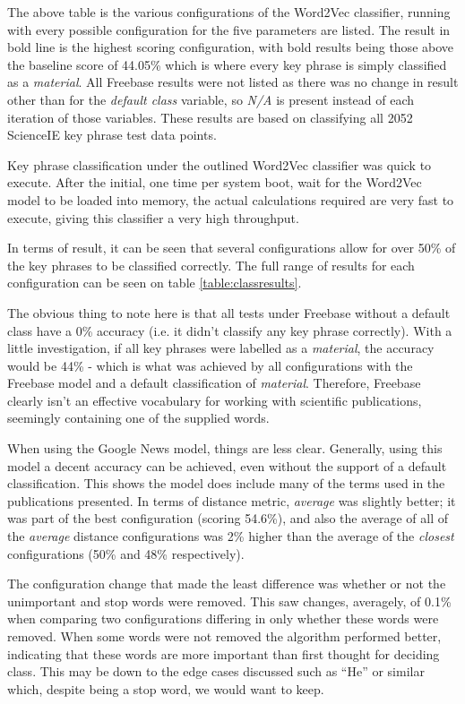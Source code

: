 \begin{table}
	\caption[Word2Vec Classification Results]{The above table is the various configurations of the Word2Vec classifier, running with every possible configuration for the five parameters are listed. The result in bold line is the highest scoring configuration, with bold results being those above the baseline score of 44.05\% which is where every key phrase is simply classified as a \textit{material}. All Freebase results were not listed as there was no change in result other than for the \textit{default class} variable, so \textit{N/A} is present instead of each iteration of those variables. These results are based on classifying all 2052 ScienceIE key phrase test data points.}
	\label{table:classresults}
\end{table}

Key phrase classification under the outlined Word2Vec classifier was quick to execute. After the initial, one time per system boot, wait for the Word2Vec model to be loaded into memory, the actual calculations required are very fast to execute, giving this classifier a very high throughput.

In terms of result, it can be seen that several configurations allow for over 50\% of the key phrases to be classified correctly. The full range of results for each configuration can be seen on table \ref{table:classresults}.

The obvious thing to note here is that all tests under Freebase without a default class have a 0\% accuracy (i.e. it didn't classify any key phrase correctly). With a little investigation, if all key phrases were labelled as a \textit{material}, the accuracy would be 44\% - which is what was achieved by all configurations with the Freebase model and a default classification of \textit{material}. Therefore, Freebase clearly isn't an effective vocabulary for working with scientific publications, seemingly containing one of the supplied words. 

When using the Google News model, things are less clear. Generally, using this model a decent accuracy can be achieved, even without the support of a default classification. This shows the model does include many of the terms used in the publications presented. In terms of distance metric, \textit{average} was slightly better; it was part of the best configuration (scoring 54.6\%), and also the average of all of the \textit{average} distance configurations was 2\% higher than the average of the \textit{closest} configurations (50\% and 48\% respectively).

The configuration change that made the least difference was whether or not the unimportant and stop words were removed. This saw changes, averagely, of 0.1\% when comparing two configurations differing in only whether these words were removed. When some words were not removed the algorithm performed better, indicating that these words are more important than first thought for deciding class. This may be down to the edge cases discussed such as ``He'' or similar which, despite being a stop word, we would want to keep.

